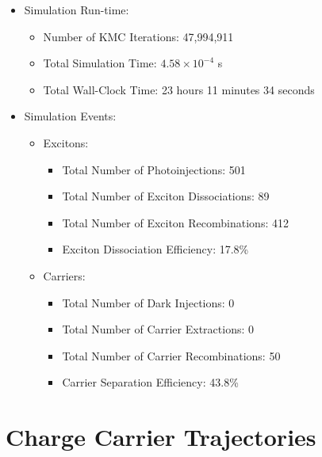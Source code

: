 \documentclass[12pt]{article}
\begin{document}
\begin{itemize}
    \item{Simulation Run-time:
            \begin{itemize}
                \item{Number of KMC Iterations: 47,994,911}
                \item{Total Simulation Time: $4.58 \times 10^{-4}$ s}
                \item{Total Wall-Clock Time: 23 hours 11 minutes 34 seconds}
            \end{itemize}
        }
    \item{Simulation Events:
            \begin{itemize}
                \item{Excitons:
                        \begin{itemize}
                            \item{Total Number of Photoinjections: 501}
                            \item{Total Number of Exciton Dissociations: 89}
                            \item{Total Number of Exciton Recombinations: 412}
                            \item{Exciton Dissociation Efficiency: 17.8\%}
                        \end{itemize}
                    }
                \item{Carriers:
                        \begin{itemize}
                            \item{Total Number of Dark Injections: 0}
                            \item{Total Number of Carrier Extractions: 0}
                            \item{Total Number of Carrier Recombinations: 50}
                            \item{Carrier Separation Efficiency: 43.8\%}
                        \end{itemize}
                    }
            \end{itemize}
        }
\end{itemize}


\clearpage
\section{Charge Carrier Trajectories}
\end{document}
